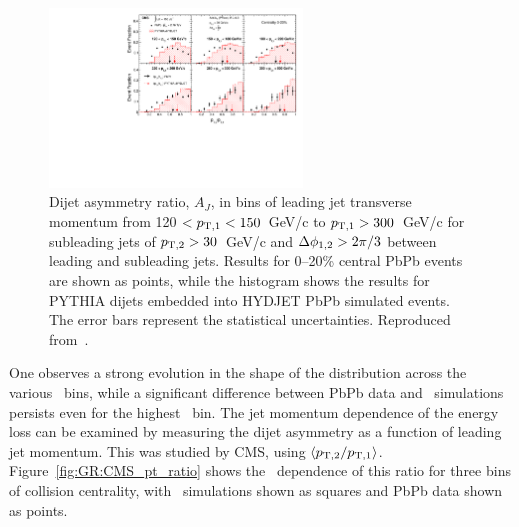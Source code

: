 \begin{figure}[!h]
\begin{center}
\includegraphics[width=0.6\textwidth]{jetfigures/dijet_imbalance5_0to20_pt_20120103_subt.pdf}
\caption{Dijet asymmetry ratio, $A_{J}$, in bins of leading jet transverse momentum from
120 $ < p_{\rm{T},1} < 150$~GeV/c to $p_{\rm{T},1} > 300$~GeV/c for
  subleading jets of $p_{\rm{T},2}> 30$~GeV/c
and $\Delta\phi_{1,2}>2\pi/3$ between leading and subleading jets.
Results for 0--20\% central PbPb events are shown as points, while the histogram
shows the results for
PYTHIA dijets embedded into HYDJET PbPb simulated events. The error bars represent the statistical uncertainties.
Reproduced from~\cite{CMS_dijet}.}
\label{fig:GR:CMS_dijet_pt}
\end{center}
\end{figure}
One observes a strong evolution in the shape of the distribution across the
various \pT\ bins, while a significant difference between PbPb data and 
\PYTHYD\ simulations persists even for the highest \pT\ bin. 
The jet momentum dependence of the energy loss can be examined by measuring the
dijet asymmetry as a function of leading jet momentum. This was studied by CMS,
using $\langle p_{\rm{T},2}/p_{\rm{T},1} \rangle$. Figure~\ref{fig:GR:CMS_pt_ratio} 
shows the \pT\ dependence of this ratio for three 
bins of collision centrality, with \PYTHYD\ simulations shown 
as squares and PbPb data shown as points. 

